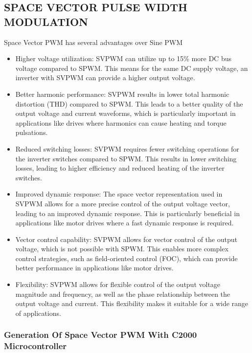 \subsection{SPACE VECTOR PULSE WIDTH MODULATION}

Space Vector PWM has several advantages over Sine PWM

\begin{itemize}
	\item Higher voltage utilization: SVPWM can utilize up to 15\% more DC bus voltage compared to SPWM. This means for the same DC supply voltage, an inverter with SVPWM can provide a higher output voltage.

	\item Better harmonic performance: SVPWM results in lower total harmonic distortion (THD) compared to SPWM. This leads to a better quality of the output voltage and current waveforms, which is particularly important in applications like drives where harmonics can cause heating and torque pulsations.

	\item Reduced switching losses: SVPWM requires fewer switching operations for the inverter switches compared to SPWM. This results in lower switching losses, leading to higher efficiency and reduced heating of the inverter switches.

	\item Improved dynamic response: The space vector representation used in SVPWM allows for a more precise control of the output voltage vector, leading to an improved dynamic response. This is particularly beneficial in applications like motor drives where a fast dynamic response is required.

	\item Vector control capability: SVPWM allows for vector control of the output voltage, which is not possible with SPWM. This enables more complex control strategies, such as field-oriented control (FOC), which can provide better performance in applications like motor drives.

	\item Flexibility: SVPWM allows for flexible control of the output voltage magnitude and frequency, as well as the phase relationship between the output voltage and current. This flexibility makes it suitable for a wide range of applications.
\end{itemize}

\subsubsection{Generation Of Space Vector PWM With C2000 Microcontroller}

